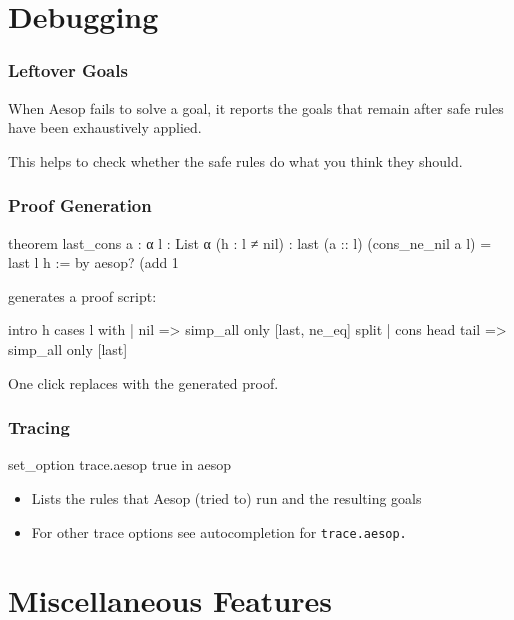 \documentclass[xetex]{beamer}
\begin{document}
\section{Debugging}

\begin{frame}
  \frametitle{Leftover Goals}

  When Aesop fails to solve a goal, it reports the goals that remain
  after safe rules have been exhaustively applied.

  This helps to check whether the safe rules do what you think they should.
\end{frame}

\begin{frame}[fragile]
  \frametitle{Proof Generation}

  \begin{leancode}
    theorem last_cons {a : α} {l : List α} (h : l ≠ nil) :
        last (a :: l) (cons_ne_nil a l) = last l h := by
      aesop? (add 1%
  \end{leancode}

  \pause

   generates a proof script:

  \begin{leancode}
    intro h
    cases l with
    | nil =>
      simp_all only [last, ne_eq]
      split
    | cons head tail => simp_all only [last]
  \end{leancode}

  One click replaces  with the generated proof.
\end{frame}

\begin{frame}[fragile]
  \frametitle{Tracing}

  \begin{leancode}
    set_option trace.aesop true in
    aesop
  \end{leancode}

  \pause

  \begin{itemize}[<+->]
    \item Lists the rules that Aesop (tried to) run and the resulting goals
    \item For other trace options see autocompletion for \texttt{trace.aesop.}
  \end{itemize}
\end{frame}

\section{Miscellaneous Features}
\end{document}
